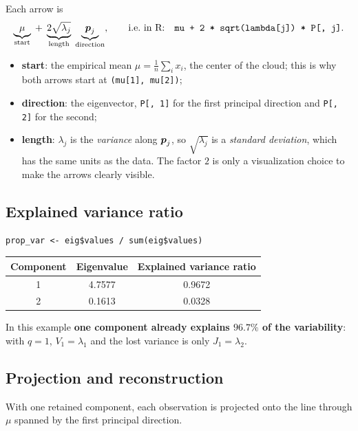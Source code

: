 Each arrow is
\[
  \underbrace{\mu}_{\text{start}} \;+\; \underbrace{2\sqrt{\lambda_j}}_{\text{length}} \; \underbrace{\boldsymbol{p}_j}_{\text{direction}},
  \qquad\text{i.e.\ in R:}\quad \texttt{mu + 2 * sqrt(lambda[j]) * P[, j]}.
\]
\begin{itemize}
  \item \textbf{start}: the empirical mean $\mu = \frac{1}{n}\sum_{i} x_i$, the center of the cloud;
        this is why both arrows start at \texttt{(mu[1], mu[2])};
  \item \textbf{direction}: the eigenvector, \texttt{P[, 1]} for the first principal direction and
        \texttt{P[, 2]} for the second;
  \item \textbf{length}: $\lambda_j$ is the \emph{variance} along $\boldsymbol{p}_j$, so $\sqrt{\lambda_j}$ is a
        \emph{standard deviation}, which has the same units as the data. The factor $2$ is only a
        visualization choice to make the arrows clearly visible.
\end{itemize}

\subsection{Explained variance ratio}

\begin{lstlisting}
prop_var <- eig$values / sum(eig$values)
\end{lstlisting}

\begin{center}
\begin{tabular}{ccc}
  \hline
  Component & Eigenvalue & Explained variance ratio \\
  \hline
  1 & 4.7577 & 0.9672 \\
  2 & 0.1613 & 0.0328 \\
  \hline
\end{tabular}
\end{center}

In this example \textbf{one component already explains $96.7\%$ of the variability}: with $q = 1$,
$V_1 = \lambda_1$ and the lost variance is only $J_1 = \lambda_2$.

\subsection{Projection and reconstruction}

With one retained component, each observation is projected onto the line through $\mu$ spanned by
the first principal direction.

